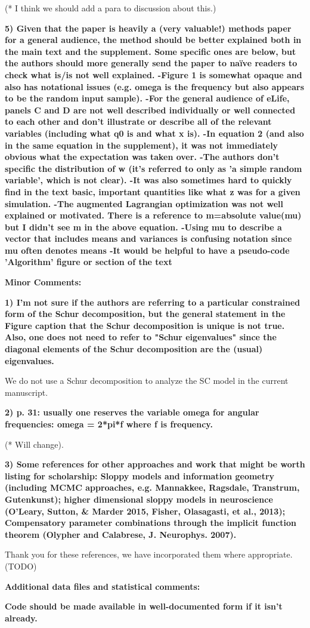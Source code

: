 \documentclass[11pt,a4paper]{article}
\begin{document}
(* I think we should add a para to discussion about this.)

\textbf{5) Given that the paper is heavily a (very valuable!) methods paper for a general audience, the method should be better explained both in the main text and the supplement. Some specific ones are below, but the authors should more generally send the paper to naïve readers to check what is/is not well explained. 
-Figure 1 is somewhat opaque and also has notational issues (e.g. omega is the frequency but also appears to be the random input sample). 
-For the general audience of eLife, panels C and D are not well described individually or well connected to each other and don't illustrate or describe all of the relevant variables (including what q0 is and what x is). 
-In equation 2 (and also in the same equation in the supplement), it was not immediately obvious what the expectation was taken over. 
-The authors don't specific the distribution of w (it's referred to only as 'a simple random variable', which is not clear). 
-It was also sometimes hard to quickly find in the text basic, important quantities like what z was for a given simulation. 
-The augmented Lagrangian optimization was not well explained or motivated. There is a reference to m=absolute value(mu) but I didn't see m in the above equation. 
-Using mu to describe a vector that includes means and variances is confusing notation since mu often denotes means 
-It would be helpful to have a pseudo-code 'Algorithm' figure or section of the text }

\textbf{Minor Comments: }

\textbf{1) I'm not sure if the authors are referring to a particular constrained form of the Schur decomposition, but the general statement in the Figure caption that the Schur decomposition is unique is not true. Also, one does not need to refer to "Schur eigenvalues" since the diagonal elements of the Schur decomposition are the (usual) eigenvalues. }

We do not use a Schur decomposition to analyze the SC model in the current manuscript.

\textbf{2) p. 31: usually one reserves the variable omega for angular frequencies: omega = 2*pi*f where f is frequency. }

(* Will change).

\textbf{3) Some references for other approaches and work that might be worth listing for scholarship: Sloppy models and information geometry (including MCMC approaches, e.g. Mannakkee, Ragsdale, Transtrum, Gutenkunst); higher dimensional sloppy models in neuroscience (O'Leary, Sutton, \& Marder 2015, Fisher, Olasagasti, et al., 2013); Compensatory parameter combinations through the implicit function theorem (Olypher and Calabrese, J. Neurophys. 2007). }

Thank you for these references, we have incorporated them where appropriate. (TODO)

\textbf{Additional data files and statistical comments:}

\textbf{Code should be made available in well-documented form if it isn't already. }
\end{document}
